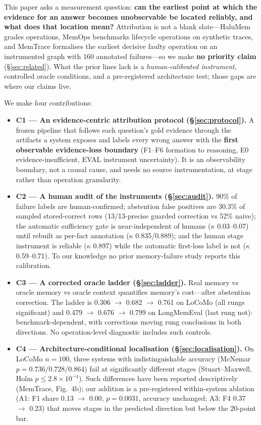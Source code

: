 \documentclass[11pt]{article}
\begin{document}
This paper asks a measurement question: \textbf{can the earliest point at
which the evidence for an answer becomes unobservable be located reliably,
and what does that location mean?} Attribution is not a blank
slate---HaluMem \citep{chen2025halumem} grades operations, MemOps
\citep{hao2026memops} benchmarks lifecycle operations on synthetic traces, and
MemTrace \citep{deng2026memtrace} formalises the earliest decisive faulty
operation on an instrumented graph with 160 annotated failures---so we make
\textbf{no priority claim} (\S\ref{sec:related}). What the prior lines lack is
a \emph{human-calibrated instrument}, controlled oracle conditions, and a
pre-registered architecture test; those gaps are where our claims live.

We make four contributions:

\begin{itemize}
\item \textbf{C1 --- An evidence-centric attribution protocol
(\S\ref{sec:protocol}).} A frozen pipeline that follows each question's gold
evidence through the artifacts a system exposes and labels every wrong answer
with the \textbf{first observable evidence-loss boundary} (F1--F6 formation to
reasoning, E0 evidence-insufficient, EVAL instrument uncertainty). It is an
observability boundary, not a causal cause, and needs no source
instrumentation, at stage rather than operation granularity.

\item \textbf{C2 --- A human audit of the instruments (\S\ref{sec:audit}).}
90\% of failure labels are human-confirmed; abstention false positives
are 30.3\% of sampled stored-correct rows (13/13-precise guarded correction vs
52\% naive); the automatic sufficiency gate is
near-independent of humans ($\kappa$ 0.03--0.07) until rebuilt as per-fact
annotation ($\kappa$ 0.835/0.889); and the human stage instrument is reliable
($\kappa$ 0.897) while the automatic first-loss label is not
($\kappa$ 0.59--0.71). To our knowledge no prior memory-failure study reports
this calibration.

\item \textbf{C3 --- A corrected oracle ladder (\S\ref{sec:ladder}).} Real
memory vs oracle memory vs oracle context quantifies memory's cost---after
abstention correction. The ladder is 0.306 $\to$ 0.682 $\to$ 0.761 on LoCoMo
(all rungs significant) and 0.479 $\to$ 0.676 $\to$ 0.799 on LongMemEval (last
rung not): benchmark-dependent, with corrections moving rung conclusions in
both directions. No operation-level diagnostic includes such controls.

\item \textbf{C4 --- Architecture-conditional localisation
(\S\ref{sec:localisation}).} On LoCoMo $n{=}100$, three systems with
indistinguishable accuracy (McNemar $p = 0.736/0.728/0.864$) fail at
significantly different stages (Stuart--Maxwell, Holm $p \leq
2.8\times10^{-4}$). Such differences have been reported descriptively
(MemTrace, Fig.~4b); our addition is a pre-registered within-system ablation
(A1: F1 share 0.13 $\to$ 0.00, $p = 0.0031$, accuracy unchanged; A3: F4
0.37 $\to$ 0.23) that moves stages in the predicted direction but below the
20-point bar.
\end{itemize}
\end{document}
